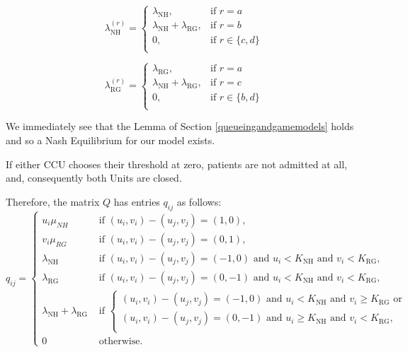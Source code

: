 \documentclass{article}
\newcommand{\NH}{\text{NH}}
\newcommand{\RG}{\text{RG}}
\begin{document}
\begin{minipage}[t]{0.5\textwidth}
\small{$$\lambda_{\NH}^{(r)}=\begin{cases}
\lambda_{\NH}, &\text{if }r=a\\
\lambda_{\NH}+\lambda_{\RG},  &\text{if }r=b\\
0, &\text{if }r\in\{c,d\}\\
\end{cases}$$}
\end{minipage}
\begin{minipage}[t]{0.5\textwidth}
\small{$$\lambda_{\RG}^{(r)}=\begin{cases}
\lambda_{\RG}, &\text{if }r=a\\
\lambda_{\NH}+\lambda_{\RG},  &\text{if }r=c\\
0, &\text{if }r\in\{b,d\}\\
\end{cases}$$}
\end{minipage}

We immediately see that the Lemma of Section \ref{queueingandgamemodels} holds and so a Nash Equilibrium for our model exists.

If either CCU chooses their threshold at zero, patients are not admitted at all, and, consequently both Units are closed.

Therefore, the matrix $Q$ has entries $q_{ij}$ as follows:
\begin{equation}
q_{ij}=\begin{cases} u_i\mu_{NH} & \text{ if  } (u_i,v_i)-(u_j,v_j)=(1,0),\\
 v_i\mu_{RG} & \text{ if  } (u_i,v_i)-(u_j,v_j)=(0,1),\\
 \lambda_{\NH} & \text{ if  } (u_i,v_i)-(u_j,v_j)=(-1,0)\text{ and } u_i<K_{\NH} \text{ and } v_i<K_{\RG},\\
 \lambda_{\RG} & \text{ if  } (u_i,v_i)-(u_j,v_j)=(0,-1) \text{ and } u_i<K_{\NH} \text{ and } v_i < K_{\RG},\\
\lambda_{\NH}+\lambda_{\RG} & \text{ if  } \left\{\begin{array}{l} (u_i,v_i)-(u_j,v_j)=(-1,0) \text{ and } u_i<K_{\NH} \text{ and } v_i \geq K_{\RG} \text{ or}\\ (u_i,v_i)-(u_j,v_j)=(0,-1) \text{ and } u_i \geq K_{\NH} \text{ and } v_i < K_{\RG},\\\end{array}\right.\\
0 & \text{ otherwise}.
\end{cases}
\end{equation}
\end{document}
